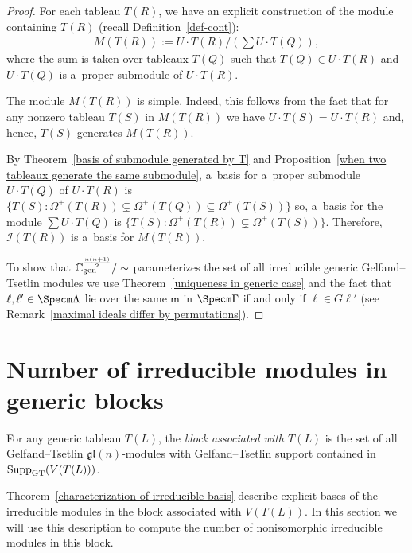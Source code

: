 \documentclass[pdftex]{sigma}
\numberwithin{equation}{section}
\begin{document}
\begin{proof}

For each tableau $T(R)$, we have an explicit construction of the module containing $T(R)$ (recall
Def\/inition~\ref{def-cont}):
\begin{gather*}
M(T(R)):=U\cdot T(R)/\left(\sum U\cdot T(Q)\right),
\end{gather*}
where the sum is taken over tableaux $T(Q)$ such that $T(Q)\in U\cdot T(R)$ and $U\cdot T(Q)$ is a~proper submodule of
$U\cdot T(R)$.

The module $M(T(R))$ is simple.
Indeed, this follows from the fact that for any nonzero tableau $T(S)$ in $M(T(R))$ we have $U\cdot T(S)=U\cdot T(R)$
and, hence, $T(S)$ generates $M(T(R))$.

By Theorem~\ref{basis of submodule generated by T} and Proposition~\ref{when two tableaux generate the same submodule},
a~basis for a~proper submodule $U\cdot T(Q)$ of $U\cdot T(R)$ is
$\{T(S):\Omega^{+}(T(R))\subsetneq\Omega^{+}(T(Q))\subseteq \Omega^{+}(T(S))\}$ so, a~basis for the module $\sum U\cdot
T(Q)$ is $\{T(S):\Omega^{+}(T(R))\subsetneq\Omega^{+}(T(S))\}$.
Therefore, $\mathcal{I}(T(R))$ is a~basis for $M(T(R))$.

To show that ${\mathbb C}^{\frac{n(n+1)}{2}}_{\rm gen}/ \sim$ parameterizes the set of all irreducible generic
Gelfand--Tsetlin modules we use Theorem~\ref{uniqueness in generic case} and the fact that $\ell, \ell'\in\Specm\Lambda$ lie over the same $\mathsf m$
in $\Specm\Gamma$ if and only if $\ell\in G\ell'$ (see Remark~\ref{maximal ideals differ by permutations}).
\end{proof}

\section{Number of irreducible modules in generic blocks}

\begin{Definition}
For any generic tableau $T(L)$, the {\em block associated with $T(L)$} is the set of all Gelfand--Tsetlin
$\mathfrak{gl}(n)$-modules with Gelfand--Tsetlin support contained in $\operatorname{Supp}_{\rm GT}(V(T(L)))$.
\end{Definition}

Theorem~\ref{characterization of irreducible basis} describe explicit bases of the irreducible modules in the block
associated with $V(T(L))$.
In this section we will use this description to compute the number of nonisomorphic irreducible modules in this block.
\end{document}
